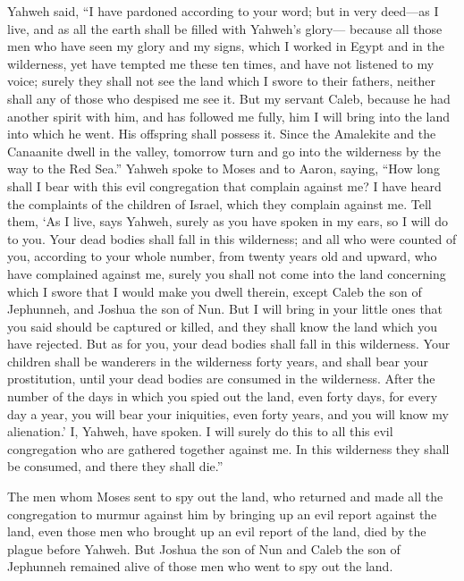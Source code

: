  Yahweh said, ``I have pardoned according to your word;
 but in very deed---as I live, and as all the earth shall
be filled with Yahweh's glory---  because all those men who
have seen my glory and my signs, which I worked in Egypt and in the
wilderness, yet have tempted me these ten times, and have not listened
to my voice;  surely they shall not see the land which I
swore to their fathers, neither shall any of those who despised me see
it.  But my servant Caleb, because he had another spirit
with him, and has followed me fully, him I will bring into the land into
which he went. His offspring shall possess it.  Since the
Amalekite and the Canaanite dwell in the valley, tomorrow turn and go
into the wilderness by the way to the Red Sea.''  Yahweh
spoke to Moses and to Aaron, saying,  ``How long shall I
bear with this evil congregation that complain against me? I have heard
the complaints of the children of Israel, which they complain against
me.  Tell them, `As I live, says Yahweh, surely as you have
spoken in my ears, so I will do to you.  Your dead bodies
shall fall in this wilderness; and all who were counted of you,
according to your whole number, from twenty years old and upward, who
have complained against me,  surely you shall not come into
the land concerning which I swore that I would make you dwell therein,
except Caleb the son of Jephunneh, and Joshua the son of Nun.
 But I will bring in your little ones that you said should
be captured or killed, and they shall know the land which you have
rejected.  But as for you, your dead bodies shall fall in
this wilderness.  Your children shall be wanderers in the
wilderness forty years, and shall bear your prostitution, until your
dead bodies are consumed in the wilderness.  After the
number of the days in which you spied out the land, even forty days, for
every day a year, you will bear your iniquities, even forty years, and
you will know my alienation.'  I, Yahweh, have spoken. I
will surely do this to all this evil congregation who are gathered
together against me. In this wilderness they shall be consumed, and
there they shall die.''

 The men whom Moses sent to spy out the land, who returned
and made all the congregation to murmur against him by bringing up an
evil report against the land,  even those men who brought
up an evil report of the land, died by the plague before Yahweh.
 But Joshua the son of Nun and Caleb the son of Jephunneh
remained alive of those men who went to spy out the land.

